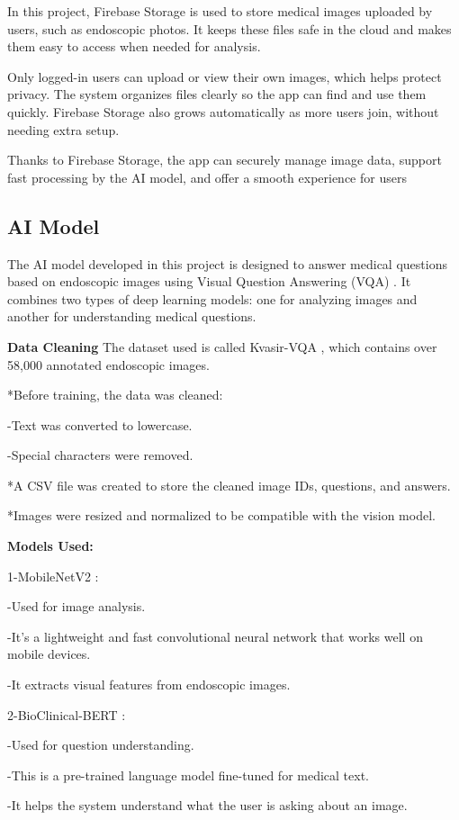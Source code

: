 \documentclass[12pt,a4paper]{report}
\begin{document}
In this project, Firebase Storage is used to store medical images uploaded by users, such as endoscopic photos. It keeps these files safe in the cloud and makes them easy to access when needed for analysis.

Only logged-in users can upload or view their own images, which helps protect privacy. The system organizes files clearly so the app can find and use them quickly. Firebase Storage also grows automatically as more users join, without needing extra setup.

Thanks to Firebase Storage, the app can securely manage image data, support fast processing by the AI model, and offer a smooth experience for users

\subsection{AI Model}
The AI model developed in this project is designed to answer medical questions based on endoscopic images using Visual Question Answering (VQA) . It combines two types of deep learning models: one for analyzing images and another for understanding medical questions.

\textbf{Data Cleaning}
The dataset used is called Kvasir-VQA , which contains over 58,000 annotated endoscopic images.

*Before training, the data was cleaned:

-Text was converted to lowercase.

-Special characters were removed.

*A CSV file was created to store the cleaned image IDs, questions, and answers.

*Images were resized and normalized to be compatible with the vision model.

\textbf{Models Used:}

1-MobileNetV2 :

-Used for image analysis.

-It's a lightweight and fast convolutional neural network that works well on mobile devices.

-It extracts visual features from endoscopic images.

2-BioClinical-BERT :

-Used for question understanding.

-This is a pre-trained language model fine-tuned for medical text.

-It helps the system understand what the user is asking about an image.
\end{document}
